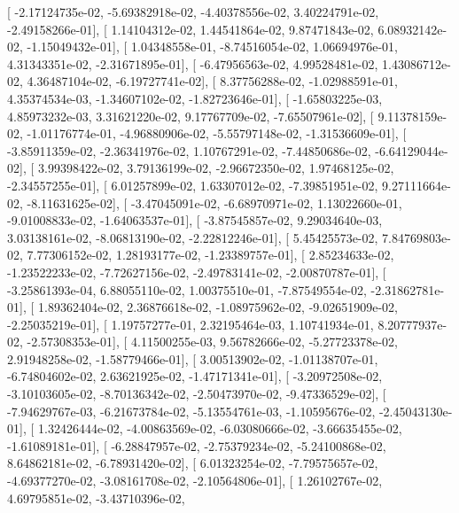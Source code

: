 \documentclass{article}
\begin{document}
       [ -2.17124735e-02,  -5.69382918e-02,  -4.40378556e-02,
          3.40224791e-02,  -2.49158266e-01],
       [  1.14104312e-02,   1.44541864e-02,   9.87471843e-02,
          6.08932142e-02,  -1.15049432e-01],
       [  1.04348558e-01,  -8.74516054e-02,   1.06694976e-01,
          4.31343351e-02,  -2.31671895e-01],
       [ -6.47956563e-02,   4.99528481e-02,   1.43086712e-02,
          4.36487104e-02,  -6.19727741e-02],
       [  8.37756288e-02,  -1.02988591e-01,   4.35374534e-03,
         -1.34607102e-02,  -1.82723646e-01],
       [ -1.65803225e-03,   4.85973232e-03,   3.31621220e-02,
          9.17767709e-02,  -7.65507961e-02],
       [  9.11378159e-02,  -1.01176774e-01,  -4.96880906e-02,
         -5.55797148e-02,  -1.31536609e-01],
       [ -3.85911359e-02,  -2.36341976e-02,   1.10767291e-02,
         -7.44850686e-02,  -6.64129044e-02],
       [  3.99398422e-02,   3.79136199e-02,  -2.96672350e-02,
          1.97468125e-02,  -2.34557255e-01],
       [  6.01257899e-02,   1.63307012e-02,  -7.39851951e-02,
          9.27111664e-02,  -8.11631625e-02],
       [ -3.47045091e-02,  -6.68970971e-02,   1.13022660e-01,
         -9.01008833e-02,  -1.64063537e-01],
       [ -3.87545857e-02,   9.29034640e-03,   3.03138161e-02,
         -8.06813190e-02,  -2.22812246e-01],
       [  5.45425573e-02,   7.84769803e-02,   7.77306152e-02,
          1.28193177e-02,  -1.23389757e-01],
       [  2.85234633e-02,  -1.23522233e-02,  -7.72627156e-02,
         -2.49783141e-02,  -2.00870787e-01],
       [ -3.25861393e-04,   6.88055110e-02,   1.00375510e-01,
         -7.87549554e-02,  -2.31862781e-01],
       [  1.89362404e-02,   2.36876618e-02,  -1.08975962e-02,
         -9.02651909e-02,  -2.25035219e-01],
       [  1.19757277e-01,   2.32195464e-03,   1.10741934e-01,
          8.20777937e-02,  -2.57308353e-01],
       [  4.11500255e-03,   9.56782666e-02,  -5.27723378e-02,
          2.91948258e-02,  -1.58779466e-01],
       [  3.00513902e-02,  -1.01138707e-01,  -6.74804602e-02,
          2.63621925e-02,  -1.47171341e-01],
       [ -3.20972508e-02,  -3.10103605e-02,  -8.70136342e-02,
         -2.50473970e-02,  -9.47336529e-02],
       [ -7.94629767e-03,  -6.21673784e-02,  -5.13554761e-03,
         -1.10595676e-02,  -2.45043130e-01],
       [  1.32426444e-02,  -4.00863569e-02,  -6.03080666e-02,
         -3.66635455e-02,  -1.61089181e-01],
       [ -6.28847957e-02,  -2.75379234e-02,  -5.24100868e-02,
          8.64862181e-02,  -6.78931420e-02],
       [  6.01323254e-02,  -7.79575657e-02,  -4.69377270e-02,
         -3.08161708e-02,  -2.10564806e-01],
       [  1.26102767e-02,   4.69795851e-02,  -3.43710396e-02,
\end{document}
